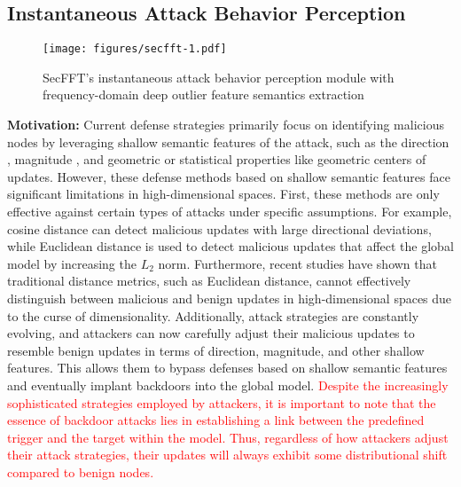 \documentclass[lettersize,journal]{IEEEtran}
\begin{document}
\subsection{Instantaneous Attack Behavior Perception}
\begin{figure}[!t]
    \centering
    \texttt{[image: figures/secfft-1.pdf]}
    \caption{SecFFT's instantaneous attack behavior perception module with frequency-domain deep outlier feature semantics extraction}
    \label{fig2:instant}
\end{figure}
\textbf{Motivation:} 
Current defense strategies primarily focus on identifying malicious nodes by leveraging shallow semantic features of the attack, such as the direction \cite{foolsgold}, magnitude \cite{sun2019can}, and geometric or statistical properties like geometric centers \cite{pillutla2022robust} of updates. However, these defense methods based on shallow semantic features face significant limitations in high-dimensional spaces. First, these methods are only effective against certain types of attacks under specific assumptions. For example, cosine distance can detect malicious updates with large directional deviations, while Euclidean distance is used to detect malicious updates that affect the global model by increasing the $L_2$ norm. Furthermore, recent studies \cite{huang2023multi} have shown that traditional distance metrics, such as Euclidean distance, cannot effectively distinguish between malicious and benign updates in high-dimensional spaces due to the curse of dimensionality. Additionally, attack strategies are constantly evolving, and attackers can now carefully adjust their malicious updates to resemble benign updates in terms of direction, magnitude, and other shallow features. This allows them to bypass defenses based on shallow semantic features and eventually implant backdoors into the global model. \textcolor{red}{Despite the increasingly sophisticated strategies employed by attackers, it is important to note that the essence of backdoor attacks lies in establishing a link between the predefined trigger and the target within the model. Thus, regardless of how attackers adjust their attack strategies, their updates will always exhibit some distributional shift compared to benign nodes.}
\end{document}
